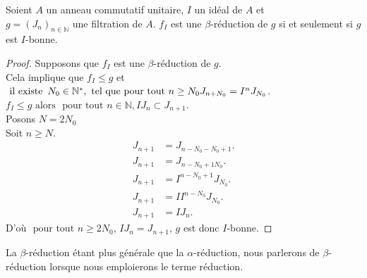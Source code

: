 \begin{maproposition}
	Soient $A$ un anneau commutatif unitaire, $I$ un idéal de $A$ et \\ $g = (J_n)_{n \in \mathbb{N}}$ une filtration de $A$. $f_I$ est une $\beta$-réduction de $g$ si et seulement si $g$ est $I$-bonne.
\end{maproposition}
\begin{proof}
	Supposons que $f_I$ est une $\beta$-réduction de $g$.\\
	Cela implique que $f_I \leq g$ et $\text{ il existe } \, N_0 \in \mathbb{N^*} , \text{ tel que pour tout } n \geq N_0 \\ J_{n+N_0} = I^n J_{N_0}$.\\
	$f_I \leq g \text{ alors } \text{ pour tout } n \in \mathbb{N} , IJ_n \subset J_{n+1}$.\\
	Posons $N = 2N_0$\\
	Soit $n \geq N$. 
	\begin{align*}
		J_{n+1} &= J_{n-N_0-N_0+1}.\\
		J_{n+1} &= J_{n-N_0+1N_0}.\\
		J_{n+1} &= I^{n-N_0+1} J_{N_0}.\\
		J_{n+1} &= II^{n-N_0} J_{N_0}.\\
		J_{n+1} &= IJ_n.
	\end{align*}
	D'où $\text{ pour tout } n \geq 2N_0$, $IJ_n = J_{n+1}$, $g$ est donc $I$-bonne. 
\end{proof}
\begin{maremarque}
	La $\beta$-réduction étant plus générale que la $\alpha$-réduction, nous parlerons de $\beta$-réduction lorsque nous emploierons le terme réduction.
\end{maremarque}

